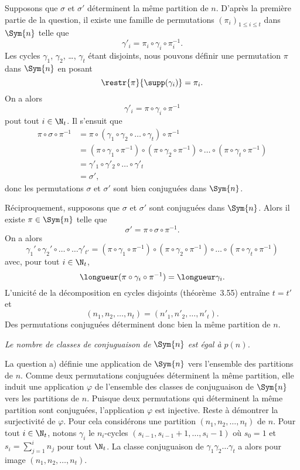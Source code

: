 \begin{enumerate}
    Supposons que $\sigma$ et $\sigma'$ déterminent la même partition de $n$.
    D'après la première partie de la question, il existe une famille de permutations $(\pi_i)_{1\leq i\leq t}$ dans $\Sym{n}$ telle que
    \[
      \gamma'_i = \pi_i\circ\gamma_i\circ\pi_i^{-1}.
    \]
    Les cycles $\gamma_1$, $\gamma_2$, \dots, $\gamma_t$ étant disjoints, nous pouvons définir une permutation $\pi$ dans $\Sym{n}$ en posant
    \[
      \restr{\pi}{\supp(\gamma_i)} = \pi_i.
    \]
    On a alors
    \[
      \gamma'_i = \pi\circ\gamma_i\circ\pi^{-1}
    \]
    pout tout $i\in\N_t$.
    Il s'ensuit que
    \begin{align*}
      \pi\circ\sigma\circ\pi^{-1}
        &= \pi\circ(\gamma_1\circ\gamma_2\circ\dots\circ\gamma_t)\circ\pi^{-1} \\
        &= (\pi\circ\gamma_1\circ\pi^{-1})\circ(\pi\circ\gamma_2\circ\pi^{-1})\circ\dots\circ
            (\pi\circ\gamma_t\circ\pi^{-1}) \\
        &= \gamma'_1\circ\gamma'_2\circ\dots\circ\gamma'_t \\
        &= \sigma',
    \end{align*}
    donc les permutations $\sigma$ et $\sigma'$ sont bien conjuguées dans $\Sym{n}$.

    Réciproquement, supposons que $\sigma$ et $\sigma'$ sont conjuguées dans $\Sym{n}$.
    Alors il existe $\pi\in\Sym{n}$ telle que
    \[
      \sigma' = \pi\circ\sigma\circ\pi^{-1}.
    \]
    On a alors
    \[
      \gamma_1'\circ\gamma_2'\circ\dots\circ\dots\gamma'_{t'}
        = (\pi\circ\gamma_1\circ\pi^{-1})\circ(\pi\circ\gamma_2\circ\pi^{-1})\circ\dots\circ(\pi\circ\gamma_t\circ\pi^{-1})
    \]
    avec, pour tout $i\in\N_t$,
    \[
      \longueur(\pi\circ\gamma_i\circ\pi^{-1}) = \longueur \gamma_i.
    \]
    L'unicité de la décomposition en cycles disjoints (théorème~3.55) entraîne $t = t'$ et
    \[
      (n_1, n_2, \dots, n_t) = (n'_1, n'_2, \dots, n'_t).
    \]
    Des permutations conjuguées déterminent donc bien la même partition de $n$.

    \emph{Le nombre de classes de conjuguaison de $\Sym{n}$ est égal à $p(n)$.}

    La question a) définie une application de $\Sym{n}$ vers l'ensemble des partitions de $n$.
    Comme deux permutations conjuguées déterminent la même partition, elle induit une application $\varphi$ de l'ensemble des classes de conjuguaison de $\Sym{n}$ vers les partitions de $n$.
    Puisque deux permutations qui déterminent la même partition sont conjuguées, l'application $\varphi$ est injective.
    Reste à démontrer la surjectivité de $\varphi$.
    Pour cela considérons une partition $(n_1, n_2, \dots, n_t)$ de $n$.
    Pour tout $i\in\N_t$, notons $\gamma_i$ le $n_i$-cycles $(s_{i - 1}, s_{i - 1} + 1, \dots, s_i - 1)$ où $s_0 = 1$ et $s_i = \sum_{j=1}^i n_j$ pour tout $\N_t$.
    La classe conjuguaison de $\gamma_1\gamma_2\dots\gamma_t$ a alors pour image $(n_1, n_2, \dots, n_t)$.
\end{enumerate}
